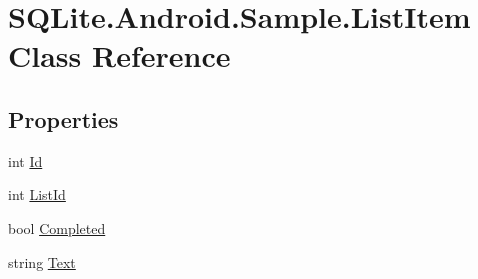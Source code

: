 \hypertarget{class_s_q_lite_1_1_android_1_1_sample_1_1_list_item}{\section{S\+Q\+Lite.\+Android.\+Sample.\+List\+Item Class Reference}
\label{class_s_q_lite_1_1_android_1_1_sample_1_1_list_item}
}
\subsection*{Properties}
\begin{DoxyCompactItemize}
\item 
int \hyperlink{class_s_q_lite_1_1_android_1_1_sample_1_1_list_item_ad274a4802c6ee194257b235ba353c4ab}{Id}
\item 
int \hyperlink{class_s_q_lite_1_1_android_1_1_sample_1_1_list_item_ab3eeb5d601f7269d2c25aa9e4fbd110d}{List\+Id}
\item 
bool \hyperlink{class_s_q_lite_1_1_android_1_1_sample_1_1_list_item_adc0d9f441a49b46c2737e742afa424f4}{Completed}
\item 
string \hyperlink{class_s_q_lite_1_1_android_1_1_sample_1_1_list_item_a3c2b2b067af15209a65171f377eaba46}{Text}
\end{DoxyCompactItemize}


